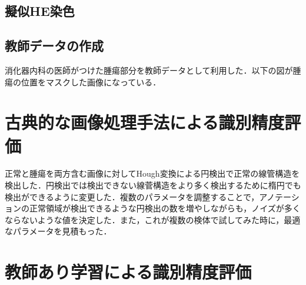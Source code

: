 \begin{figure}
{}
\end{figure}


\subsection{擬似HE染色}

\subsection{教師データの作成}
消化器内科の医師がつけた腫瘍部分を教師データとして利用した．以下の図が腫瘍の位置をマスクした画像になっている．

\begin{figure}
	\centering
\end{figure}


\section{古典的な画像処理手法による識別精度評価}
正常と腫瘍を両方含む画像に対してHough変換による円検出で正常の線管構造を検出した．円検出では検出できない線菅構造をより多く検出するために楕円でも検出ができるように変更した．複数のパラメータを調整することで，アノテーションの正常領域が検出できるような円検出の数を増やしながらも，ノイズが多くならないような値を決定した．また，これが複数の検体で試してみた時に，最適なパラメータを見積もった．

\section{教師あり学習による識別精度評価}
